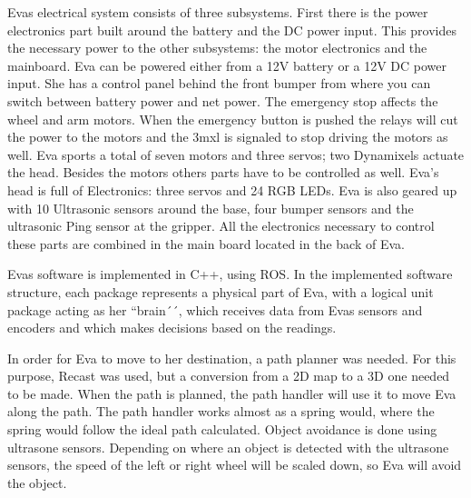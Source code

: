 \documentclass[project_eva.tex]{subfiles}
\begin{document}
Eva\textquotesingle s electrical system consists of three subsystems. First there is the power electronics part built
around the battery and the DC power input. This provides the necessary power to the other subsystems: the motor electronics and the mainboard. Eva can be powered either from a 12V battery or a 12V DC power input. She has a control panel behind the front bumper from where you can switch between battery power and net power. The emergency stop affects the wheel and arm motors. When the emergency button is pushed the relays will cut the power to the motors and the 3mxl is signaled to stop driving the motors as well. Eva sports a total of seven motors and three servos; two Dynamixels actuate the head. Besides the motors others parts have to be controlled as well. Eva’s head is full of Electronics: three servo\textquotesingle s and 24 RGB LEDs. Eva is also geared up with 10 Ultrasonic sensors around the base, four bumper sensors and the ultrasonic Ping sensor at the gripper. All the electronics necessary to control these parts are combined in the main board located in the back of Eva.

Eva\textquotesingle s software is implemented in C++, using ROS. In the implemented software structure, each package represents a physical part of Eva, with a logical unit package acting as her ``brain´´, which receives data from Eva\textquotesingle s sensors and encoders and which makes decisions based on the readings. 

In order for Eva to move to her destination, a path planner was needed. For this purpose, Recast was used, but a conversion from a 2D map to a 3D one needed to be made. When the path is planned, the path handler will use it to move Eva along the path. The path handler works almost as a spring would, where the spring would follow the ideal path calculated. Object avoidance is done using ultrasone sensors. Depending on where an object is detected
with the ultrasone sensors, the speed of the left or right wheel will be scaled down, so Eva will avoid the object.
\end{document}
